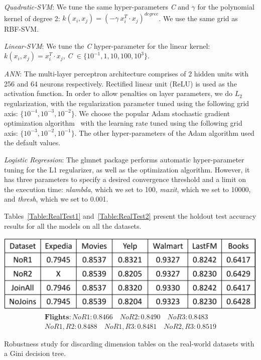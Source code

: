 \documentclass{vldb}
\begin{document}
\vspace{2mm}
\textit{Quadratic-SVM}: We tune the same hyper-parameters \textit{C} and $\gamma$ for the polynomial kernel of degree 2:
$k(x_i,x_j) = (-\gamma \  x_i ^T \cdot x_j)^{degree}$. We use the same grid as RBF-SVM.
\vspace{2mm}

\textit{Linear-SVM}: We tune the \textit{C} hyper-parameter for the linear kernel: 
$k(x_i,x_j) = x_i ^T \cdot x_j $, \textit{C} $\in \{10^{-1}, 1, 10, 100, 10^3\}$.

\vspace{2mm}
\textit{ANN}: The multi-layer perceptron architecture comprises of 2 hidden units with 256 and 64 neurons respectively. 
Rectified linear unit (ReLU) is used as the activation function. In order to allow penalties on layer parameters, we do $L_2$ regularization, with 
the regularization parameter tuned using the following grid axis: $\{ 10^{-4}, 10^{-3}, 10^{-2} \}$. We choose the popular Adam stochastic 
gradient optimization algorithm~\cite{adam} with the learning rate tuned using the following grid axis:  $\{ 10^{-3}, 10^{-2}, 10^{-1} \}$. 
The other hyper-parameters of the Adam algorithm used the default values.

\vspace{2mm}
\textit{Logistic Regression}: The glmnet package performs automatic hyper-parameter tuning for the L1 regularizer, as well as the optimization algorithm.
However, it has three parameters to specify a desired convergence threshold and a limit on the execution time: \textit{nlambda}, which we set to 100,
\textit{maxit}, which we set to 10000, and \textit{thresh}, which we set to 0.001.

Tables~\ref{Table:RealTest1} and~\ref{Table:RealTest2} present the holdout test accuracy results for all the models on all the datasets.

\begin{table}[t]
\centering
\includegraphics[width=\columnwidth,height=\textheight,keepaspectratio]{table4.pdf}
\begin{align*}
\textbf{Flights} : NoR1: 0.8466 \quad NoR2: 0.8490 \quad NoR3: 0.8483 \\
No R1,R2: 0.8488 \quad No R1,R3: 0.8481 \quad No R2,R3: 0.8519
\end{align*}
\caption{Robustness study for discarding dimension tables on the real-world datasets with a Gini decision tree.}
\label{Table:robustness}
\end{table}
\end{document}

